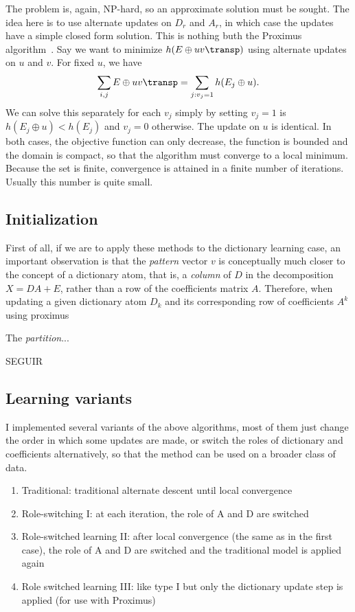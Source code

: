 \documentclass[a4paper]{IEEEtran}
\begin{document}
The problem   is, again, NP-hard, so an approximate solution must be sought. The idea here is to use alternate updates on $D_r$ and $A_r$, in which case the updates have a simple closed form solution. This is nothing buth the Proximus algorithm~\cite{proximus}. Say we want to minimize $h(E \oplus uv\transp)$ using alternate updates on $u$ and $v$. For fixed $u$, we have
$$
\sum_{i,j} E \oplus uv\transp = \sum_{j: v_j = 1} h(E_j \oplus u).
$$
We can solve this separately for each $v_j$ simply by setting $v_j = 1$ is $h(E_j \oplus u) < h(E_j)$ and $v_j=0$ otherwise. The update on $u$ is identical. In both cases, the objective function can only decrease, the function is bounded and the domain is compact, so that the algorithm must converge to a local minimum. Because the set is finite, convergence is attained in a finite number of iterations. Usually this number is quite small.

\subsection{Initialization}

First of all, if we are to apply these methods to the dictionary learning case, an important observation is that the \emph{pattern} vector $v$ is conceptually much closer to the concept of a dictionary atom, that is, a \emph{column} of $D$ in the decomposition $X=DA+E$, rather than a row of the coefficients matrix $A$. Therefore, when updating a given dictionary atom $D_k$ and its corresponding row of coefficients $A^k$ using proximus

The \emph{partition}...

SEGUIR


\subsection{Learning variants}

I implemented several variants of the above algorithms, most of them just change the order in which some updates are made, or switch the roles of dictionary and coefficients alternatively, so that the method can be used on a broader class of data.
 

\begin{enumerate}
\item Traditional: traditional alternate descent until local convergence
\item Role-switching I: at each iteration, the role of A and D are switched
\item Role-switched learning II: after local convergence (the same as in the first case), the role of A and D are switched and the traditional model is applied again
\item Role switched learning III: like type I but only the dictionary update step is applied (for use with Proximus)
\end{enumerate}
\end{document}
